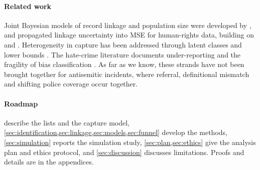 \paragraph{Related work}
Joint Bayesian models of record linkage and population size were developed
by \citet{tancredi2011}, and \citet{sadinle2018} propagated linkage
uncertainty into MSE for human-rights data, building on \citet{sadinle2017}
and \citet{fellegi1969}. Heterogeneity in capture has been addressed through
latent classes \citep{manriquevallier2016} and lower bounds
\citep{chao1987}. The hate-crime literature documents under-reporting
\citep{pezzella2019} and the fragility of bias classification
\citep{mcdevitt2003}. As far as we know, these strands have not been brought
together for antisemitic incidents, where referral, definitional mismatch
and shifting police coverage occur together.

\paragraph{Roadmap}
 describe the lists and the capture model,
\cref{sec:identification,sec:linkage,sec:models,sec:funnel} develop the
methods, \cref{sec:simulation} reports the simulation study,
\cref{sec:plan,sec:ethics} give the analysis plan and ethics protocol, and
\cref{sec:discussion} discusses limitations. Proofs and details are in the
appendices.
